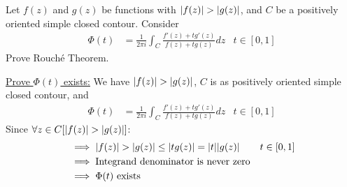 \documentclass[12pt, english]{book}
\makeatletter
\renewenvironment{proof}[1][\proofname]{\par
	\pushQED{\qed}%
	\normalfont \topsep6\p@\@plus6\p@\relax
	\list{}{%
		\settowidth{\leftmargin}{\itshape\proofname:\hskip\labelsep}%
		\setlength{\labelwidth}{0pt}%
		\setlength{\itemindent}{-\leftmargin}%
	}%
	\item[\hskip\labelsep\itshape#1\@addpunct{:}]\ignorespaces
	}{ \popQED\endlist\@endpefalse}
\makeatother
\begin{document}
	\begin{example}
		\label{Rouche's Theorem Alternate Proof - Complex}
		Let \(f(z)\) and \(g(z)\) be functions with \(\abs{f(z)} > \abs{g(z)}\), and \(C\) be a positively oriented simple closed contour. Consider 
		\begin{align*}
			\Phi(t) &= \frac{1}{2\pi i} \int_{C} \frac{f'(z) + t g'(z)}{f(z) + tg(z)} dz
				& t \in [0, 1]
		\end{align*}
		Prove Rouché Theorem.
		\begin{proof}
			{\color{Grey}
			\underline{Prove \(\Phi(t)\) exists:} \newline
			We have \(\abs{f(z)} > \abs{g(z)}\), \(C\) is as positively oriented simple closed contour, and 
			\begin{align*}
				\Phi(t) &= \frac{1}{2\pi i} \int_{C} \frac{f'(z) + t g'(z)}{f(z) + tg(z)} dz
				& t \in [0, 1]
			\end{align*}
			Since \(\forall z \in C [\abs{f(z)} > \abs{g(z)}]\):
			\begin{align*}
				&\implies \abs{f(z)} > \abs{g(z)} \leq \abs{tg(z)}  = \abs{t} \abs{g(z)} 
					& t \in [0, 1] \\
				&\implies \text{Integrand denominator is never zero} \\
				&\implies \Phi(t) \text{ exists}
			\end{align*}
			
}
\end{proof}
\end{example}
\end{document}
